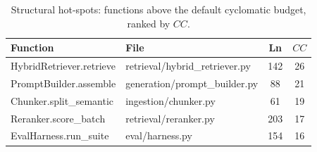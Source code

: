 \begin{table}[!htbp]
  \centering
  \caption{Structural hot-spots: functions above the default cyclomatic
           budget, ranked by $CC$.}
  \label{tab:hotspots}
  \renewcommand{\arraystretch}{1.2}
  \small
  \begin{tabularx}{\columnwidth}{@{}
      >{\ttfamily\scriptsize}l
      >{\ttfamily\scriptsize\raggedright\arraybackslash}X
      c c @{}}
    \toprule
    \normalfont\textbf{Function} & \normalfont\textbf{File} &
    \normalfont\textbf{Ln} & \normalfont\textbf{$CC$} \\
    \midrule
    HybridRetriever.retrieve   & retrieval/hybrid\_retriever.py & 142 & 26 \\
    PromptBuilder.assemble     & generation/prompt\_builder.py  & \phantom{0}88 & 21 \\
    Chunker.split\_semantic    & ingestion/chunker.py           & \phantom{0}61 & 19 \\
    Reranker.score\_batch      & retrieval/reranker.py          & 203 & 17 \\
    EvalHarness.run\_suite     & eval/harness.py                & 154 & 16 \\
    \bottomrule
  \end{tabularx}
\end{table}
